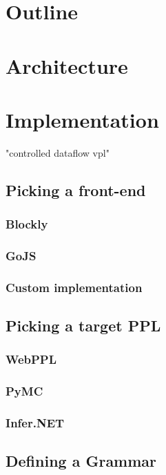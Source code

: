 \section{Outline}

\section{Architecture}

\section{Implementation}

 "controlled dataflow vpl"

\subsection{Picking a front-end}

\subsubsection{Blockly}

\subsubsection{GoJS}

\subsubsection{Custom implementation}

\subsection{Picking a target PPL}

\subsubsection{WebPPL}

\subsubsection{PyMC}

\subsubsection{Infer.NET}

\subsection{Defining a Grammar}

